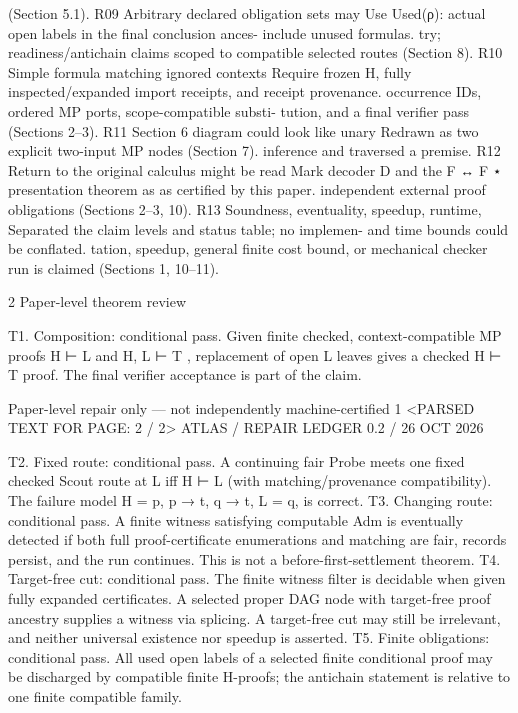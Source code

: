                                                                 (Section 5.1).
R09           Arbitrary declared obligation sets may            Use Used(ρ): actual open labels in the final conclusion ances-
              include unused formulas.                          try; readiness/antichain claims scoped to compatible selected
                                                                routes (Section 8).
R10           Simple formula matching ignored contexts          Require frozen H, fully inspected/expanded import receipts,
              and receipt provenance.                           occurrence IDs, ordered MP ports, scope-compatible substi-
                                                                tution, and a final verifier pass (Sections 2–3).
R11           Section 6 diagram could look like unary           Redrawn as two explicit two-input MP nodes (Section 7).
              inference and traversed a premise.
R12           Return to the original calculus might be read     Mark decoder D and the F ↔ F ⋆ presentation theorem as
              as certified by this paper.                       independent external proof obligations (Sections 2–3, 10).
R13           Soundness, eventuality, speedup, runtime,         Separated the claim levels and status table; no implemen-
              and time bounds could be conflated.               tation, speedup, general finite cost bound, or mechanical
                                                                checker run is claimed (Sections 1, 10–11).


2 Paper-level theorem review

T1. Composition: conditional pass. Given finite checked, context-compatible MP proofs H ⊢ L and H, L ⊢ T ,
    replacement of open L leaves gives a checked H ⊢ T proof. The final verifier acceptance is part of the claim.

Paper-level repair only — not independently machine-certified                                                                  1
<PARSED TEXT FOR PAGE: 2 / 2>
ATLAS / REPAIR LEDGER                                                                              0.2 / 26 OCT 2026



T2. Fixed route: conditional pass. A continuing fair Probe meets one fixed checked Scout route at L iff
    H ⊢ L (with matching/provenance compatibility). The failure model H = {p, p → t, q → t}, L = q, is correct.
T3. Changing route: conditional pass. A finite witness satisfying computable Adm is eventually detected if
    both full proof-certificate enumerations and matching are fair, records persist, and the run continues. This is
    not a before-first-settlement theorem.
T4. Target-free cut: conditional pass. The finite witness filter is decidable when given fully expanded
    certificates. A selected proper DAG node with target-free proof ancestry supplies a witness via splicing. A
    target-free cut may still be irrelevant, and neither universal existence nor speedup is asserted.
T5. Finite obligations: conditional pass. All used open labels of a selected finite conditional proof may be
    discharged by compatible finite H-proofs; the antichain statement is relative to one finite compatible family.


